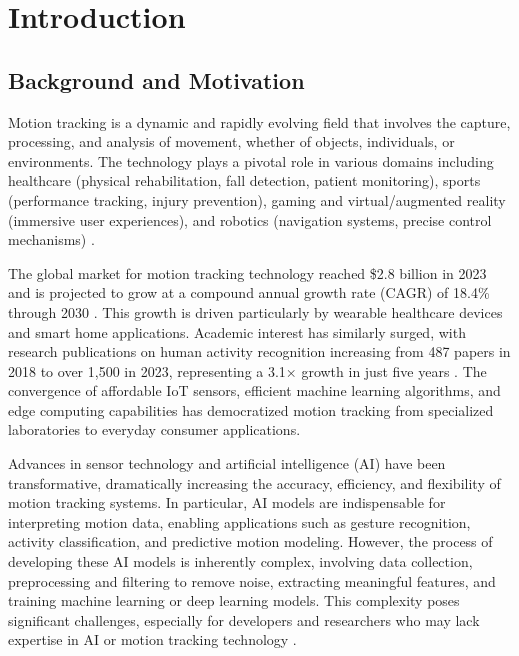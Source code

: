 \chapter{Introduction}
\label{chap:introduction}

\section{Background and Motivation}

Motion tracking is a dynamic and rapidly evolving field that involves the capture, processing, and analysis of movement, whether of objects, individuals, or environments. The technology plays a pivotal role in various domains including healthcare (physical rehabilitation, fall detection, patient monitoring), sports (performance tracking, injury prevention), gaming and virtual/augmented reality (immersive user experiences), and robotics (navigation systems, precise control mechanisms) \cite{article:human_motion_tracking_survey}.

The global market for motion tracking technology reached \$2.8 billion in 2023 and is projected to grow at a compound annual growth rate (CAGR) of 18.4\% through 2030 \cite{marketreport2023motion}. This growth is driven particularly by wearable healthcare devices and smart home applications. Academic interest has similarly surged, with research publications on human activity recognition increasing from 487 papers in 2018 to over 1,500 in 2023, representing a 3.1× growth in just five years \cite{wang2024har_comparative}. The convergence of affordable IoT sensors, efficient machine learning algorithms, and edge computing capabilities has democratized motion tracking from specialized laboratories to everyday consumer applications.

Advances in sensor technology and artificial intelligence (AI) have been transformative, dramatically increasing the accuracy, efficiency, and flexibility of motion tracking systems. In particular, AI models are indispensable for interpreting motion data, enabling applications such as gesture recognition, activity classification, and predictive motion modeling. However, the process of developing these AI models is inherently complex, involving data collection, preprocessing and filtering to remove noise, extracting meaningful features, and training machine learning or deep learning models. This complexity poses significant challenges, especially for developers and researchers who may lack expertise in AI or motion tracking technology \cite{article:motion_tracking_using_AI}.

